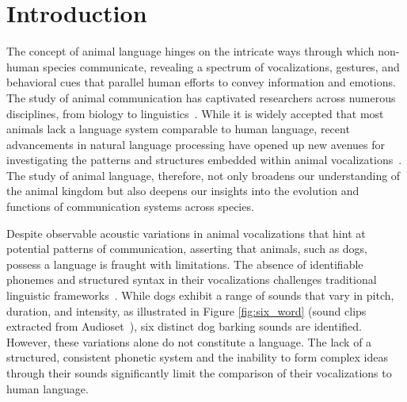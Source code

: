 \section{Introduction}

The concept of animal language hinges on the intricate ways through which non-human species communicate, revealing a spectrum of vocalizations, gestures, and behavioral cues that parallel human efforts to convey information and emotions. The study of animal communication has captivated researchers across numerous disciplines,
from biology to linguistics~\citep{rutz2023using,paladini2020bark,robbins2000vocal}. 
While it is widely accepted that most animals lack a language system comparable to human language,
recent advancements in natural language processing have opened up new avenues for investigating the patterns and structures embedded within animal vocalizations~\citep{huang2023transcribing,wang2023towards}. The study of animal language, therefore, not only broadens our understanding of the animal kingdom but also deepens our insights into the evolution and functions of communication systems across species.
 
 

Despite observable acoustic variations in animal vocalizations that hint at potential patterns of communication, asserting that animals, such as dogs, possess a language is fraught with limitations. The absence of identifiable phonemes and structured syntax in their vocalizations challenges traditional linguistic frameworks~\citep{holdcroft1991saussure}. While dogs exhibit a range of sounds that vary in pitch, duration, and intensity, as illustrated in Figure \ref{fig:six_word} (sound clips extracted from Audioset~\citep{gemmeke2017audio}), six distinct dog barking sounds are identified. However,  these variations alone do not constitute a language. The lack of a structured, consistent phonetic system and the inability to form complex ideas through their sounds significantly limit the comparison of their vocalizations to human language.

